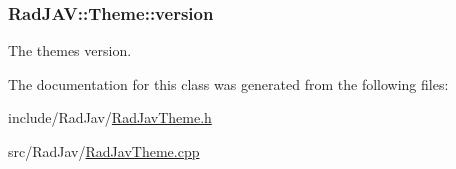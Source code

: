 \subsubsection[{\texorpdfstring{version}{version}}]{ Rad\+J\+A\+V\+::\+Theme\+::version\hspace{0.3cm}{\ttfamily [protected]}}\hypertarget{class_rad_j_a_v_1_1_theme_a7cd795ecd11078a8416415cee5aec2f3}{}\label{class_rad_j_a_v_1_1_theme_a7cd795ecd11078a8416415cee5aec2f3}


The theme\textquotesingle{}s version. 



The documentation for this class was generated from the following files\+:\begin{DoxyCompactItemize}
\item 
include/\+Rad\+Jav/\hyperlink{_rad_jav_theme_8h}{Rad\+Jav\+Theme.\+h}\item 
src/\+Rad\+Jav/\hyperlink{_rad_jav_theme_8cpp}{Rad\+Jav\+Theme.\+cpp}\end{DoxyCompactItemize}
